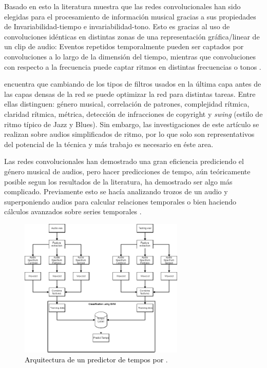 Basado en esto la literatura muestra que las redes convolucionales han sido elegidas para el procesamiento de información musical gracias a sus propiedades de Invariabilidad-tiempo e invariabilidad-tono. Esto es gracias al uso de convoluciones idénticas en distintas zonas de una representación gráfica/linear de un clip de audio: Eventos repetidos temporalmente pueden ser captados por convoluciones a lo largo de la dimensión del tiempo, mientras que convoluciones con respecto a la frecuencia puede captar ritmos en distintas frecuencias o tonos \citep{DBLP:journals/corr/abs-1804-08167}.

\cite{DBLP:journals/corr/abs-1804-08167} encuentra que cambiando de los tipos de filtros usados en la última capa antes de las capas densas de la red se puede optimizar la red para distintas tareas. Entre ellas distinguen: género musical, correlación de patrones, complejidad rítmica, claridad rítmica, métrica, detección de infracciones de copyright y \textit{swing} (estilo de ritmo típico de Jazz y Blues). Sin embargo, las investigaciones de este artículo se realizan sobre audios simplificados de ritmo, por lo que solo son representativos del potencial de la técnica y más trabajo es necesario en éste area.

Las redes convolucionales han demostrado una gran eficiencia prediciendo el género musical de audios, pero hacer predicciones de tempo, aún teóricamente posible segun los resultados de la literatura, ha demostrado ser algo más complicado. Previamente esto se hacía analizando trozos de un audio y superponiendo audios para calcular relaciones temporales \citep{tristan:2005,klapuri:2006} o bien haciendo cálculos avanzados sobre series temporales \citep{sheng:2004}. 

\begin{figure}[htb]
  \centering
  \includegraphics[width=0.7\textwidth]{Figures/system_architecture_Lazaro2017.png}
  \caption{\textcolor{black}{Arquitectura de un predictor de tempos por \cite{Lazaro2017MusicTC}}.}
  \label{Fig:system_architecture_Lazaro2017}
\end{figure}

